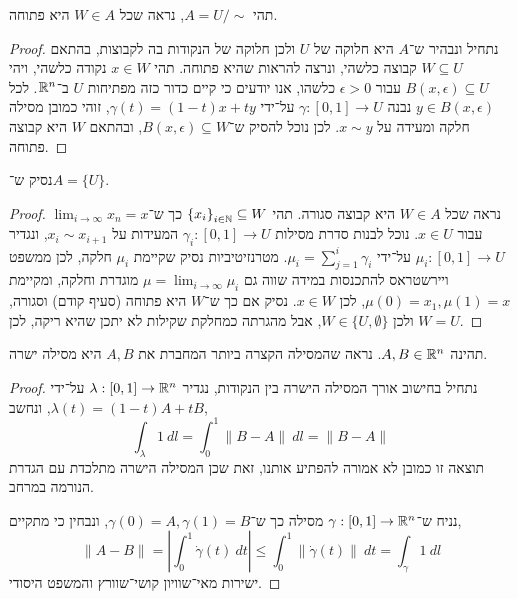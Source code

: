 \subquestion{}
תהי $A = U / \sim$, נראה שכל $W \in A$ היא פתוחה.
\begin{proof}
	נתחיל ונבהיר ש־$A$ היא חלוקה של $U$ ולכן חלוקה של הנקודות בה לקבוצות, בהתאם $W \subseteq U$ קבוצה כלשהי, ונרצה להראות שהיא פתוחה.
	תהי $x \in W$ נקודה כלשהי, ויהי $B(x, \epsilon) \subseteq U$ עבור $\epsilon > 0$ כלשהו, אנו יודעים כי קיים כדור כזה מפתיחות $U$ ב־$\mathbb{R}^n$.
	לכל $y \in B(x, \epsilon)$ נבנה $\gamma : [0, 1] \to U$ על־ידי $\gamma(t) = (1 - t)x + t y$, זוהי כמובן מסילה חלקה ומעידה על $x \sim y$.
	לכן נוכל להסיק ש־$B(x, \epsilon) \subseteq W$, ובהתאם $W$ היא קבוצה פתוחה.
\end{proof}

\subquestion{}
נסיק ש־$A = \{ U \}$.
\begin{proof}
	נראה שכל $W \in A$ היא קבוצה סגורה.
	תהי ${\{ x_i \}}_{i \in \mathbb{N}} \subseteq W$ כך ש־$\lim_{i \to \infty} x_n = x$ עבור $x \in U$.
	נוכל לבנות סדרת מסילות $\gamma_i : [0, 1] \to U$ המעידות על $x_i \sim x_{i + 1}$, ונגדיר $\mu_i : [0, 1] \to U$ על־ידי $\mu_i = \sum_{j = 1}^{i} \gamma_i$.
	מטרנזיטיביות נסיק שקיימת $\mu_i$ חלקה, לכן ממשפט ויירשטראס להתכנסות במידה שווה גם $\mu = \lim_{i \to \infty} \mu_i$ מוגדרת וחלקה, ומקיימת $\mu(0) = x_1, \mu(1) = x$, לכן $x \in W$.
	נסיק אם כך ש־$W$ היא פתוחה (סעיף קודם) וסגורה, ולכן $W \in \{ U, \emptyset \}$, אבל מהגרתה כמחלקת שקילות לא יתכן שהיא ריקה, לכן $W = U$.
\end{proof}

\question{}
\subquestion{}
תהינה $A, B \in \mathbb{R}^n$.
נראה שהמסילה הקצרה ביותר המחברת את $A, B$ היא מסילה ישרה.
\begin{proof}
	נתחיל בחישוב אורך המסילה הישרה בין הנקודות, נגדיר $\lambda : [0, 1] \to \mathbb{R}^n$ על־ידי $\lambda(t) = (1 - t)A + t B$, ונחשב,
	\[
		\int_\lambda 1\ dl
		= \int_0^1 \lVert B - A \rVert\ dl
		= \lVert B - A \rVert
	\]
	תוצאה זו כמובן לא אמורה להפתיע אותנו, זאת שכן המסילה הישרה מתלכדת עם הגדרת הנורמה במרחב.

	נניח ש־$\gamma : [0, 1] \to \mathbb{R}^n$ מסילה כך ש־$\gamma(0) = A, \gamma(1) = B$, ונבחין כי מתקיים,
	\[
		\lVert A - B \rVert
		= \left\lvert \int_0^1 \dot{\gamma}(t)\ dt \right\rvert
		\le \int_0^1 \lVert \dot{\gamma}(t) \rVert\ dt
		= \int_\gamma 1\ dl
	\]
	ישירות מאי־שוויון קושי־שוורץ והמשפט היסודי.
\end{proof}

